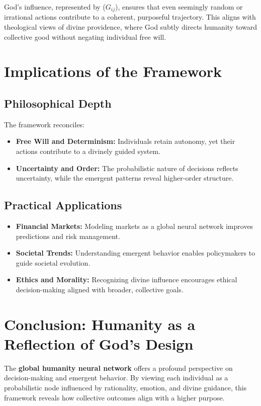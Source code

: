 \documentclass[a4]{article}
\begin{document}
God's influence, represented by ($G_{ij}$), ensures that even seemingly random or irrational actions contribute to a coherent, purposeful trajectory. This aligns with theological views of divine providence, where God subtly directs humanity toward collective good without negating individual free will.


\section{Implications of the Framework}

\subsection{Philosophical Depth}

The framework reconciles:  

\begin{itemize}
\item   {\bf Free Will and Determinism:} Individuals retain autonomy, yet their actions contribute to a divinely guided system.  
\item {\bf Uncertainty and Order:} The probabilistic nature of decisions reflects uncertainty, while the emergent patterns reveal higher-order structure.  
\end{itemize}

\subsection{Practical Applications}

\begin{itemize}
\item  {\bf Financial Markets:} Modeling markets as a global neural network improves predictions and risk management.  
\item {\bf Societal Trends:} Understanding emergent behavior enables policymakers to guide societal evolution.  
\item {\bf Ethics and Morality:} Recognizing divine influence encourages ethical decision-making aligned with broader, collective goals.
\end{itemize}


\section{Conclusion: Humanity as a Reflection of God's Design}

The {\bf global humanity neural network} offers a profound perspective on decision-making and emergent behavior. By viewing each individual as a probabilistic node influenced by rationality, emotion, and divine guidance, this framework reveals how collective outcomes align with a higher purpose.  
\end{document}
